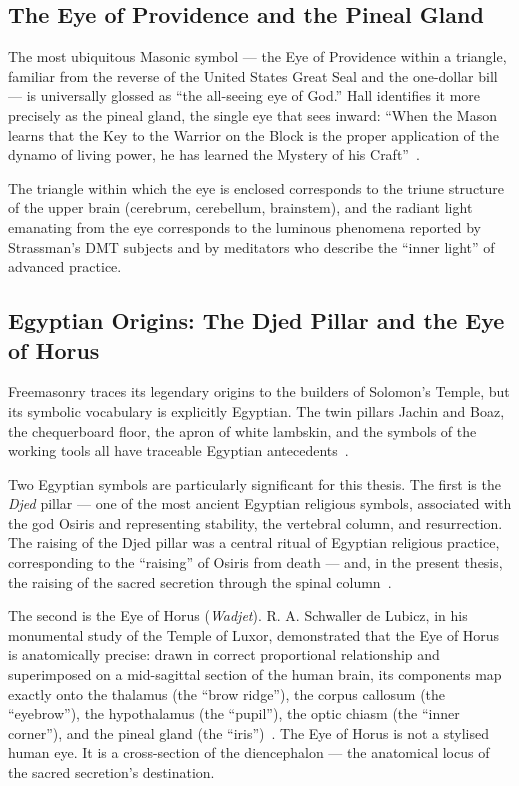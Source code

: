 \documentclass[12pt, a4paper]{article}
\begin{document}
\subsection{The Eye of Providence and the Pineal Gland}

The most ubiquitous Masonic symbol — the Eye of Providence within a triangle,
familiar from the reverse of the United States Great Seal and the one-dollar
bill — is universally glossed as ``the all-seeing eye of God.'' Hall identifies
it more precisely as the pineal gland, the single eye that sees inward:
``When the Mason learns that the Key to the Warrior on the Block is the proper
application of the dynamo of living power, he has learned the Mystery of his
Craft''~\autocite[48]{hall1928}.

The triangle within which the eye is enclosed corresponds to the triune
structure of the upper brain (cerebrum, cerebellum, brainstem), and the
radiant light emanating from the eye corresponds to the luminous phenomena
reported by Strassman's DMT subjects and by meditators who describe the
``inner light'' of advanced practice.

\subsection{Egyptian Origins: The Djed Pillar and the Eye of Horus}

Freemasonry traces its legendary origins to the builders of Solomon's Temple,
but its symbolic vocabulary is explicitly Egyptian. The twin pillars Jachin
and Boaz, the chequerboard floor, the apron of white lambskin, and the symbols
of the working tools all have traceable Egyptian
antecedents~\autocite[311]{hall1928}.

Two Egyptian symbols are particularly significant for this thesis. The first
is the \emph{Djed} pillar — one of the most ancient Egyptian religious symbols,
associated with the god Osiris and representing stability, the vertebral
column, and resurrection. The raising of the Djed pillar was a central ritual
of Egyptian religious practice, corresponding to the ``raising'' of Osiris
from death — and, in the present thesis, the raising of the sacred secretion
through the spinal column~\autocite[201]{budge1904}.

The second is the Eye of Horus (\emph{Wadjet}). R. A. Schwaller de Lubicz, in
his monumental study of the Temple of Luxor, demonstrated that the Eye of Horus
is anatomically precise: drawn in correct proportional relationship and
superimposed on a mid-sagittal section of the human brain, its components map
exactly onto the thalamus (the ``brow ridge''), the corpus callosum (the
``eyebrow''), the hypothalamus (the ``pupil''), the optic chiasm (the
``inner corner''), and the pineal gland (the ``iris'')~\autocite[198]{schwaller1998}.
The Eye of Horus is not a stylised human eye. It is a cross-section of the
diencephalon — the anatomical locus of the sacred secretion's
destination.
\end{document}
